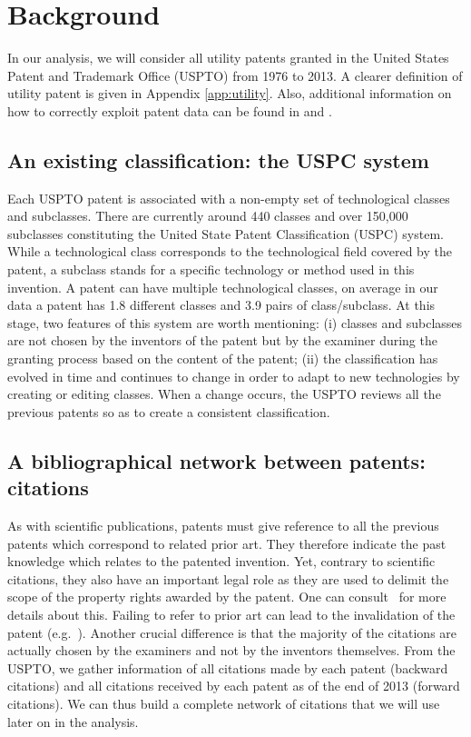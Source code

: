 \documentclass[article]{article}%
\begin{document}
\section{Background \label{data}}

In our analysis, we will consider all utility patents granted in the United States Patent and Trademark Office (USPTO) from 1976 to 2013. A clearer definition of utility patent is given in Appendix \ref{app:utility}. Also, additional information on how to correctly exploit patent data can be found in \citet{Hall2001} and \citet{lerner2015use}.

\subsection{An existing classification: the USPC system}

Each USPTO patent is associated with a non-empty set of technological classes and subclasses. There are currently around 440 classes and over 150,000 subclasses constituting the United State Patent Classification (USPC) system. While a technological class corresponds to the technological field covered by the patent, a subclass stands for a specific technology or method used in this invention. A patent can have multiple technological classes, on average in our data a patent has 1.8 different classes and 3.9 pairs of class/subclass. At this stage, two features of this system are worth mentioning: (i) classes and subclasses are not chosen by the inventors of the patent but by the examiner during the granting process based on the content of the patent; (ii) the classification has evolved in time and continues to change in order to adapt to new technologies by creating or editing classes. When a change occurs, the USPTO reviews all the previous patents so as to create a consistent classification.

\subsection{A bibliographical network between patents: citations \label{sub:citation}}

As with scientific publications, patents must give reference to all the previous patents which correspond to related prior art. They therefore indicate the past knowledge which relates to the patented invention. Yet, contrary to scientific citations, they also have an important legal role as they are used to delimit the scope of the property rights awarded by the patent. One can consult~\citet{oecdpatentmanual} for more details about this. Failing to refer to prior art can lead to the invalidation of the patent (e.g.~\citealt{martin2015}). Another crucial difference is that the majority of the citations are actually chosen by the  examiners and not by the inventors themselves. 
From the USPTO, we gather information of all citations made by each patent (backward citations) and all citations received by each patent as of the end of 2013 (forward citations). We can thus build a complete network of citations that we will use later on in the analysis.
\end{document}
